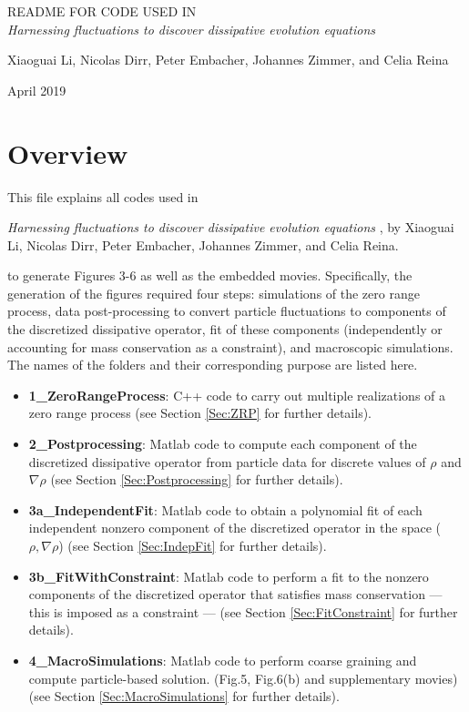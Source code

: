 \documentclass[authoryear,3p,11pt]{elsarticle}
\begin{document}
 

\begin{center}README FOR CODE USED IN \\
\textit{Harnessing fluctuations to discover dissipative evolution equations}
\end{center}

\begin{center}{\small Xiaoguai Li, Nicolas Dirr, Peter Embacher, Johannes Zimmer, and Celia Reina}
\end{center}

\begin{center}{\small April 2019}
\end{center}

\vspace{1cm}

\tableofcontents
\newpage

\section{Overview} 

This file explains all codes used in

\emph{Harnessing fluctuations to discover dissipative evolution equations
}, by Xiaoguai Li, Nicolas Dirr, Peter Embacher, Johannes Zimmer, and Celia Reina.

to generate Figures 3-6 as well as the embedded movies. Specifically, the generation of the figures required four steps: simulations of the zero range process, data post-processing to convert particle fluctuations to components of the discretized dissipative operator, fit of these components (independently or accounting for mass conservation as a constraint), and macroscopic simulations. The names of the folders and their corresponding purpose are listed here.

\begin{itemize}
\item {\bf 1\_ZeroRangeProcess}: C++ code to carry out multiple realizations of a zero range process (see Section \ref{Sec:ZRP} for further details).
\item {\bf 2\_Postprocessing}: Matlab code to compute each component of the discretized dissipative operator from particle data for discrete values of $\rho$ and $\nabla \rho$ (see Section \ref{Sec:Postprocessing} for further details).
\item {\bf 3a\_IndependentFit}: Matlab code to obtain a polynomial fit of each independent nonzero component of the discretized operator in the space ($\rho, \nabla \rho$) (see Section \ref{Sec:IndepFit} for further details).
\item {\bf 3b\_FitWithConstraint}: Matlab code to perform a fit to the nonzero components of the discretized operator that satisfies mass conservation --- this is imposed as a constraint --- (see Section \ref{Sec:FitConstraint} for further details).
\item {\bf 4\_MacroSimulations}: Matlab code to perform coarse graining and compute particle-based solution. (Fig.5, Fig.6(b) and supplementary movies) (see Section \ref{Sec:MacroSimulations} for further details).
\end{itemize}
\end{document}
